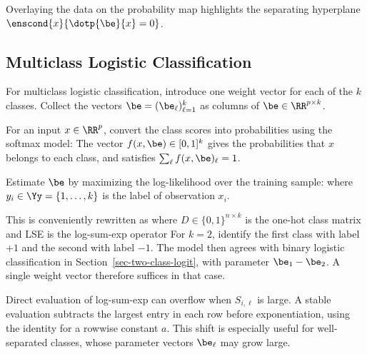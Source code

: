 Overlaying the data on the probability map highlights the separating hyperplane $\enscond{x}{\dotp{\be}{x}=0}$.




                                                            
\subsection{Multiclass Logistic Classification}
\label{sec-multiclass-logit}

For multiclass logistic classification, introduce one weight vector for each of the
$k$ classes. Collect the vectors $\be = ( \be_\ell )_{\ell=1}^k$ as columns of $\be \in \RR^{p \times k}$.

For an input $x \in \RR^p$, convert the class scores into probabilities
using the softmax model:
The vector $f(x,\be)\in[0,1]^k$ gives the probabilities that $x$ belongs
to each class, and satisfies $\sum_\ell f(x,\be)_\ell=1$.

Estimate $\be$ by maximizing the log-likelihood
over the training sample:
where $y_i \in \Yy = \{1,\ldots,k\}$ is the label of
observation $x_i$.

This is conveniently rewritten as
where $D \in \{0,1\}^{n \times k}$ is the one-hot class matrix
and LSE is the log-sum-exp operator
For $k=2$, identify the first class with label $+1$ and the second with label $-1$. The model then agrees with binary logistic classification in Section~\ref{sec-two-class-logit}, with parameter $\be_1-\be_2$. A single weight vector therefore suffices in that case.

Direct evaluation of log-sum-exp can
overflow when $S_{i,\ell}$ is large. A stable evaluation
subtracts the largest entry in each row before exponentiation,
using the identity
for a rowwise constant $a$. This shift is especially useful for well-separated classes, whose parameter vectors $\be_\ell$ may grow large.


